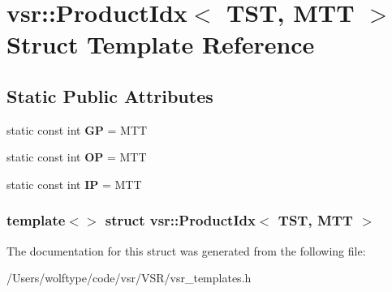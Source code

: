 \hypertarget{structvsr_1_1_product_idx_3_01_t_s_t_00_01_m_t_t_01_4}{\section{vsr\-:\-:Product\-Idx$<$ T\-S\-T, M\-T\-T $>$ Struct Template Reference}
\label{structvsr_1_1_product_idx_3_01_t_s_t_00_01_m_t_t_01_4}
}
\subsection*{Static Public Attributes}
\begin{DoxyCompactItemize}
\item 
\hypertarget{structvsr_1_1_product_idx_3_01_t_s_t_00_01_m_t_t_01_4_a908dc7c376fcf7d812a51972a0556185}{static const int {\bfseries G\-P} = M\-T\-T}\label{structvsr_1_1_product_idx_3_01_t_s_t_00_01_m_t_t_01_4_a908dc7c376fcf7d812a51972a0556185}

\item 
\hypertarget{structvsr_1_1_product_idx_3_01_t_s_t_00_01_m_t_t_01_4_accf3c0f5b45a1b31cdb298ed5afd6ec7}{static const int {\bfseries O\-P} = M\-T\-T}\label{structvsr_1_1_product_idx_3_01_t_s_t_00_01_m_t_t_01_4_accf3c0f5b45a1b31cdb298ed5afd6ec7}

\item 
\hypertarget{structvsr_1_1_product_idx_3_01_t_s_t_00_01_m_t_t_01_4_a624800379f7dc1e359baf408bb38bdd3}{static const int {\bfseries I\-P} = M\-T\-T}\label{structvsr_1_1_product_idx_3_01_t_s_t_00_01_m_t_t_01_4_a624800379f7dc1e359baf408bb38bdd3}

\end{DoxyCompactItemize}
\subsubsection*{template$<$$>$ struct vsr\-::\-Product\-Idx$<$ T\-S\-T, M\-T\-T $>$}



The documentation for this struct was generated from the following file\-:\begin{DoxyCompactItemize}
\item 
/\-Users/wolftype/code/vsr/\-V\-S\-R/vsr\-\_\-templates.\-h\end{DoxyCompactItemize}
